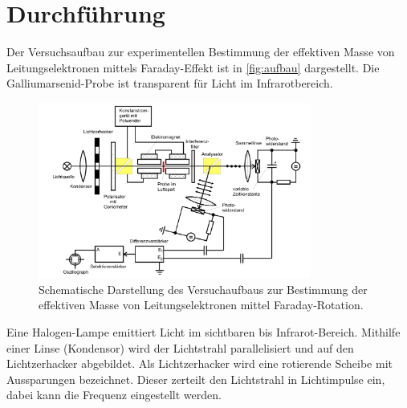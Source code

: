 \section{Durchführung}
Der Versuchsaufbau zur experimentellen Bestimmung der effektiven Masse von Leitungselektronen mittels Faraday-Effekt ist in \autoref{fig:aufbau} dargestellt.
Die Galliumarsenid-Probe ist transparent für Licht im Infrarotbereich.
\begin{figure}
    \centering
    \includegraphics[width=0.8\textwidth]{figure/aufbau.jpg}
    \caption{Schematische Darstellung des Versuchaufbaus zur Bestimmung der effektiven Masse von Leitungselektronen mittel Faraday-Rotation. \cite{anleitung}}
    \label{fig:aufbau}
\end{figure}
Eine Halogen-Lampe emittiert Licht im sichtbaren bis Infrarot-Bereich.
Mithilfe einer Linse (Kondensor) wird der Lichtstrahl parallelisiert und auf den Lichtzerhacker abgebildet.
Als Lichtzerhacker wird eine rotierende Scheibe mit Aussparungen bezeichnet.
Dieser zerteilt den Lichtstrahl in Lichtimpulse ein, dabei kann die Frequenz eingestellt werden.
\\

